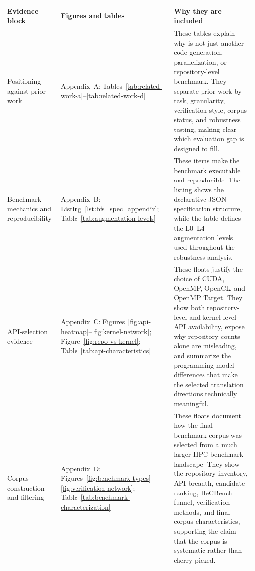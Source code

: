 \vspace{0.5em}

\begin{center}
\tiny
\renewcommand{\arraystretch}{1.18}
\setlength{\tabcolsep}{3pt}

\begin{tabularx}{0.98\textwidth}{@{}
>{\RaggedRight\arraybackslash}p{}
>{\RaggedRight\arraybackslash}p{}
X
@{}} 
\toprule
\textbf{Evidence block} & \textbf{Figures and tables} & \textbf{Why they are included} \\
\midrule

Positioning against prior work
&
Appendix~A:
Tables~\ref{tab:related-work-a}--\ref{tab:related-work-d}
&
These tables explain why \parbench{} is not just another code-generation,
parallelization, or repository-level benchmark. They separate prior work by task,
granularity, verification style, corpus status, and robustness testing, making clear
which evaluation gap \parbench{} is designed to fill. \\

Benchmark mechanics and reproducibility
&
Appendix~B:
Listing~\ref{lst:bfs_spec_appendix};
Table~\ref{tab:augmentation-levels}
&
These items make the benchmark executable and reproducible. The listing shows the
declarative JSON specification structure, while the table defines the L0--L4
augmentation levels used throughout the robustness analysis. \\

API-selection evidence
&
Appendix~C:
Figures~\ref{fig:api-heatmap}--\ref{fig:kernel-network};
Figure~\ref{fig:repo-vs-kernel};
Table~\ref{tab:api-characteristics}
&
These floats justify the choice of CUDA, OpenMP, OpenCL, and OpenMP Target. They
show both repository-level and kernel-level API availability, expose why repository
counts alone are misleading, and summarize the programming-model differences that
make the selected translation directions technically meaningful. \\

Corpus construction and filtering
&
Appendix~D:
Figures~\ref{fig:benchmark-types}--\ref{fig:verification-network};
Table~\ref{tab:benchmark-characterization}
&
These floats document how the final benchmark corpus was selected from a much larger
HPC benchmark landscape. They show the repository inventory, API breadth, candidate
ranking, HeCBench funnel, verification methods, and final corpus characteristics,
supporting the claim that the corpus is systematic rather than cherry-picked. \\


\end{tabularx}
\end{center}
